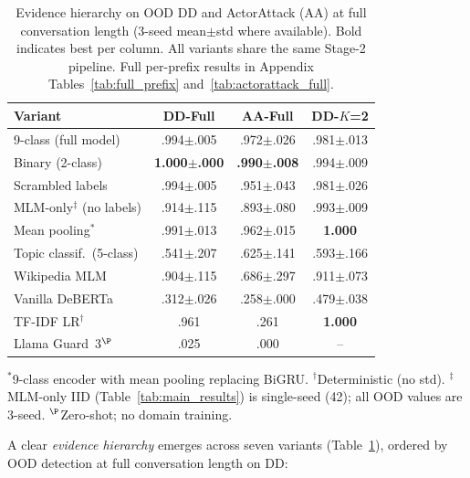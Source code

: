 \begin{table}[t]
\centering
\small
\caption{Evidence hierarchy on OOD DD and ActorAttack (AA) at full conversation length (3-seed mean$\pm$std where available). Bold indicates best per column. All variants share the same Stage-2 pipeline. Full per-prefix results in Appendix Tables~\ref{tab:full_prefix} and~\ref{tab:actorattack_full}.}
\label{tab:evidence_hierarchy}
\begin{tabular}{@{}lccc@{}}
\toprule
\textbf{Variant} & DD-Full & AA-Full & DD-$K$=2 \\
\midrule
9-class (full model) & .994$\pm$.005 & .972$\pm$.026 & .981$\pm$.013 \\
Binary (2-class) & \textbf{1.000$\pm$.000} & \textbf{.990$\pm$.008} & .994$\pm$.009 \\
Scrambled labels & .994$\pm$.005 & .951$\pm$.043 & .981$\pm$.026 \\
MLM-only$^{\ddagger}$ (no labels) & .914$\pm$.115 & .893$\pm$.080 & .993$\pm$.009 \\
Mean pooling$^{*}$ & .991$\pm$.013 & .962$\pm$.015 & \textbf{1.000} \\
\midrule
Topic classif.\ (5-class) & .541$\pm$.207 & .625$\pm$.141 & .593$\pm$.166 \\
Wikipedia MLM & .904$\pm$.115 & .686$\pm$.297 & .911$\pm$.073 \\
Vanilla DeBERTa & .312$\pm$.026 & .258$\pm$.000 & .479$\pm$.038 \\
TF-IDF LR$^{\dagger}$ & .961 & .261 & \textbf{1.000} \\
Llama Guard~3$^{\P}$ & .025 & .000 & -- \\
\bottomrule
\end{tabular}
\vspace{-2pt}
{\footnotesize $^{*}$9-class encoder with mean pooling replacing BiGRU. $^{\dagger}$Deterministic (no std). $^{\ddagger}$MLM-only IID (Table~\ref{tab:main_results}) is single-seed (42); all OOD values are 3-seed. $^{\P}$Zero-shot; no domain training.}
\end{table}

A clear \emph{evidence hierarchy} emerges across seven variants (Table~\ref{tab:evidence_hierarchy}), ordered by OOD detection at full conversation length on DD:

\vspace{2pt}
\noindent\hspace{0.5em}{\small vanilla (0.312$\pm$0.026) $<$ topic (0.541$\pm$0.207) $\ll$ wiki-MLM (0.904$\pm$0.115) $\approx$ jb-MLM (0.914$\pm$0.115) $<$ scrambled (0.994$\pm$0.005) $=$ 9-class (0.994$\pm$0.005) $\approx$ binary (1.000$\pm$0.000)}
\vspace{2pt}

